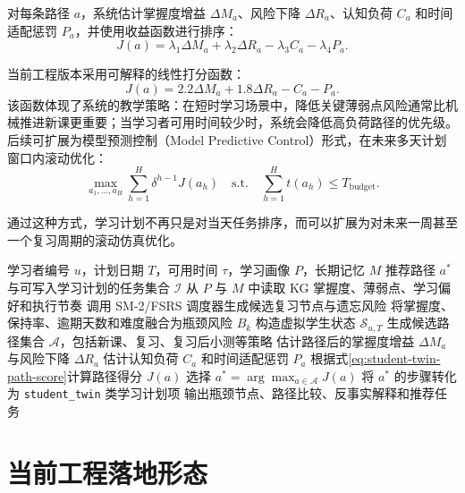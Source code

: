 对每条路径 $a$，系统估计掌握度增益 $\Delta M_a$、风险下降 $\Delta R_a$、认知负荷 $C_a$ 和时间适配惩罚 $P_a$，并使用收益函数进行排序：
\begin{equation}
  J(a)=
  \lambda_1\Delta M_a+
  \lambda_2\Delta R_a-
  \lambda_3C_a-
  \lambda_4P_a.
  \label{eq:student-twin-path-score}
\end{equation}

当前工程版本采用可解释的线性打分函数：
\[
  J(a)=2.2\Delta M_a+1.8\Delta R_a-C_a-P_a.
\]
该函数体现了系统的教学策略：在短时学习场景中，降低关键薄弱点风险通常比机械推进新课更重要；当学习者可用时间较少时，系统会降低高负荷路径的优先级。后续可扩展为模型预测控制（Model Predictive Control）形式，在未来多天计划窗口内滚动优化：
\begin{equation}
  \max_{a_1,\ldots,a_H}
  \sum_{h=1}^{H}
  \delta^{h-1}
  J(a_h)
  \quad
  \text{s.t.}\quad
  \sum_{h=1}^{H}t(a_h)\le T_{\mathrm{budget}}.
  \label{eq:student-twin-mpc}
\end{equation}

通过这种方式，学习计划不再只是对当天任务排序，而可以扩展为对未来一周甚至一个复习周期的滚动仿真优化。

\begin{algorithm}[H]
  \caption{Student Twin 反事实路径仿真}
  \label{alg:student-twin-simulation}
  \begin{algorithmic}[1]
    \Require 学习者编号 $u$，计划日期 $T$，可用时间 $\tau$，学习画像 $P$，长期记忆 $M$
    \Ensure 推荐路径 $a^\ast$ 与可写入学习计划的任务集合 $\mathcal{I}$
    \State 从 $P$ 与 $M$ 中读取 KG 掌握度、薄弱点、学习偏好和执行节奏
    \State 调用 SM-2/FSRS 调度器生成候选复习节点与遗忘风险
    \State 将掌握度、保持率、逾期天数和难度融合为瓶颈风险 $B_k$
    \State 构造虚拟学生状态 $\mathcal{S}_{u,T}$
    \State 生成候选路径集合 $\mathcal{A}$，包括新课、复习、复习后小测等策略
      \State 估计路径后的掌握度增益 $\Delta M_a$ 与风险下降 $\Delta R_a$
      \State 估计认知负荷 $C_a$ 和时间适配惩罚 $P_a$
      \State 根据式\eqref{eq:student-twin-path-score}计算路径得分 $J(a)$
    \EndFor
    \State 选择 $a^\ast=\arg\max_{a\in\mathcal{A}}J(a)$
    \State 将 $a^\ast$ 的步骤转化为 \texttt{student\_twin} 类学习计划项
    \State 输出瓶颈节点、路径比较、反事实解释和推荐任务
  \end{algorithmic}
\end{algorithm}

\section{当前工程落地形态}

